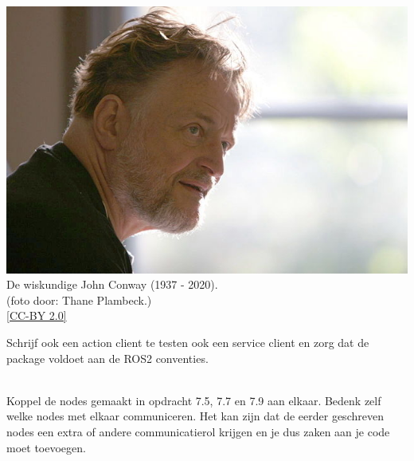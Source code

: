 \begin{exercise}
\begin{minipage}{0.6\textwidth}
\end{minipage}\hfill 
\begin{minipage}{0.3\textwidth}
\begin{center}
\includegraphics[width=\textwidth]{Pictures/640px-John_H_Conway_2005.jpg}\\
De wiskundige John Conway (1937 - 2020).\\{\tiny(foto door: Thane Plambeck.) \\ \href{https://creativecommons.org/licenses/by/2.0/deed.en}{[CC-BY 2.0]}}\\
\end{center}
\end{minipage}


\vspace{1cm}
\noindent Schrijf ook een action client te testen ook een service client en zorg dat de package voldoet aan de ROS2 conventies. \\

\end{exercise}

\begin{exercise}[Pijpleiding]\mbox{}\\
Koppel de nodes gemaakt in opdracht 7.5, 7.7 en 7.9 aan elkaar. Bedenk zelf welke nodes met elkaar communiceren. Het kan zijn dat de eerder geschreven nodes een extra of andere communicatierol krijgen en je dus zaken aan je code moet toevoegen.
\end{exercise}